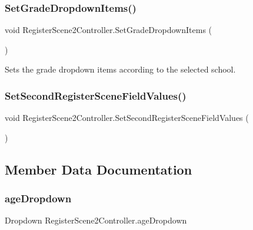 \subsubsection{\texorpdfstring{Set\+Grade\+Dropdown\+Items()}{SetGradeDropdownItems()}}
{\footnotesize\ttfamily void Register\+Scene2\+Controller.\+Set\+Grade\+Dropdown\+Items (\begin{DoxyParamCaption}{ }\end{DoxyParamCaption})\hspace{0.3cm}{\ttfamily [inline]}}



Sets the grade dropdown items according to the selected school. 

\mbox{\label{classRegisterScene2Controller_a7d0ee574e5251ed3274efd394848f602}} 
\subsubsection{\texorpdfstring{Set\+Second\+Register\+Scene\+Field\+Values()}{SetSecondRegisterSceneFieldValues()}}
{\footnotesize\ttfamily void Register\+Scene2\+Controller.\+Set\+Second\+Register\+Scene\+Field\+Values (\begin{DoxyParamCaption}{ }\end{DoxyParamCaption})\hspace{0.3cm}{\ttfamily [inline]}}



\subsection{Member Data Documentation}
\mbox{\label{classRegisterScene2Controller_ae7e20a03f95902610cace5ab23b08005}} 
\subsubsection{\texorpdfstring{age\+Dropdown}{ageDropdown}}
{\footnotesize\ttfamily Dropdown Register\+Scene2\+Controller.\+age\+Dropdown}

